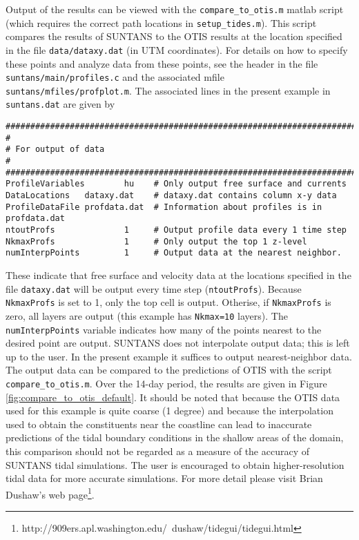 Output of the results can be viewed with the \verb+compare_to_otis.m+ matlab script
(which requires the correct path locations in \verb+setup_tides.m+).
This script compares the results of SUNTANS to the OTIS results at the location specified in the file
\verb+data/dataxy.dat+ (in UTM coordinates).  For details on how to specify these points
and analyze data from these points, see the header in the file \verb+suntans/main/profiles.c+ and the
associated mfile \verb+suntans/mfiles/profplot.m+.  The associated
lines in the present example in \verb+suntans.dat+ are given by
\begin{verbatim}
########################################################################
#
# For output of data
#
########################################################################
ProfileVariables        hu    # Only output free surface and currents
DataLocations   dataxy.dat    # dataxy.dat contains column x-y data
ProfileDataFile profdata.dat  # Information about profiles is in profdata.dat
ntoutProfs              1     # Output profile data every 1 time step
NkmaxProfs              1     # Only output the top 1 z-level
numInterpPoints         1     # Output data at the nearest neighbor.
\end{verbatim}
These indicate that free surface and velocity data at the locations specified in the file \verb+dataxy.dat+
will be output every time step (\verb+ntoutProfs+).  Because \verb+NkmaxProfs+ is set to 1, only the
top cell is output.  Otherise, if \verb+NkmaxProfs+ is zero, all layers are output (this example has
\verb+Nkmax=10+ layers).  The \verb+numInterpPoints+ variable indicates how many of the points nearest to
the desired point are output.  SUNTANS does not interpolate output data; this is left up to the user.
In the present example it suffices to output nearest-neighbor data.  The output data can be compared to
the predictions of OTIS with the script \verb+compare_to_otis.m+.  Over the 14-day
period, the results are given in Figure \ref{fig:compare_to_otis_default}.  It should be noted that because
the OTIS data used for this example is quite coarse (1 degree) and because the interpolation used to
obtain the constituents near the coastline can lead to inaccurate predictions of the tidal boundary conditions
in the shallow areas of the domain, this comparison should not be regarded as a measure of the accuracy
of SUNTANS tidal simulations.  The user is encouraged to obtain higher-resolution tidal data for more accurate
simulations.  For more detail please visit Brian Dushaw's web page\footnote{
http://909ers.apl.washington.edu/~dushaw/tidegui/tidegui.html}.
